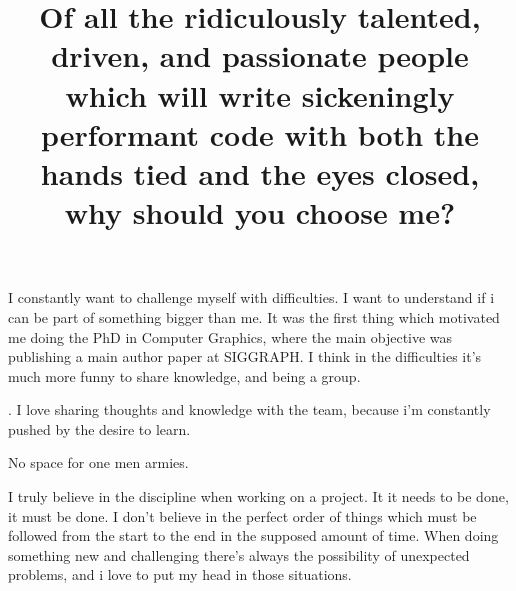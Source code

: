 \documentclass[acmlarge]{acmart}
\begin{document}
\title{Of all the ridiculously talented, driven, and passionate people which will write sickeningly performant code with both the hands tied and the eyes closed, why should you choose me?}
\maketitle

I constantly want to challenge myself with difficulties. I want to understand if i can be part of something bigger than me. It was the first thing which motivated me doing the PhD in Computer Graphics, where the main objective was publishing a main author paper at SIGGRAPH. I think in the difficulties it's much more funny to share knowledge, and being a group. 

. I love sharing thoughts and knowledge with the team, because i'm constantly pushed by the desire to learn.

No space for one men armies. 

I truly believe in the discipline when working on a project. It it needs to be done, it must be done. I don't believe in the perfect order of things which must be followed from the start to the end in the supposed amount of time. When doing something new and challenging there's always the possibility of unexpected problems, and i love to put my head in those situations.
\end{document}
